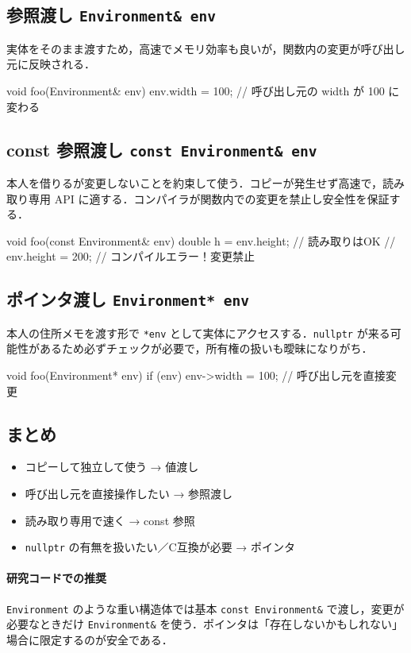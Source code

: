 \documentclass[10pt,letterpaper]{jsarticle}
\begin{document}
\subsection{参照渡し \texttt{Environment\& env}}
実体をそのまま渡すため，高速でメモリ効率も良いが，関数内の変更が呼び出し元に反映される．
\begin{cppcode}
void foo(Environment& env) {
    env.width = 100; // 呼び出し元の width が 100 に変わる
}
\end{cppcode}

\subsection{const 参照渡し \texttt{const Environment\& env}}
本人を借りるが変更しないことを約束して使う．コピーが発生せず高速で，読み取り専用 API に適する．コンパイラが関数内での変更を禁止し安全性を保証する．
\begin{cppcode}
void foo(const Environment& env) {
    double h = env.height;  // 読み取りはOK
    // env.height = 200;    // コンパイルエラー！変更禁止
}
\end{cppcode}

\subsection{ポインタ渡し \texttt{Environment* env}}
本人の住所メモを渡す形で \texttt{*env} として実体にアクセスする．\texttt{nullptr} が来る可能性があるため必ずチェックが必要で，所有権の扱いも曖昧になりがち．
\begin{cppcode}
void foo(Environment* env) {
    if (env) {
        env->width = 100; // 呼び出し元を直接変更
    }
}
\end{cppcode}

\subsection{まとめ}
\begin{itemize}
\item コピーして独立して使う → 値渡し
\item 呼び出し元を直接操作したい → 参照渡し
\item 読み取り専用で速く → const 参照
\item \texttt{nullptr} の有無を扱いたい／C互換が必要 → ポインタ
\end{itemize}

\paragraph{研究コードでの推奨}
\texttt{Environment} のような重い構造体では基本 \texttt{const Environment\&} で渡し，変更が必要なときだけ \texttt{Environment\&} を使う．ポインタは「存在しないかもしれない」場合に限定するのが安全である．
\end{document}
